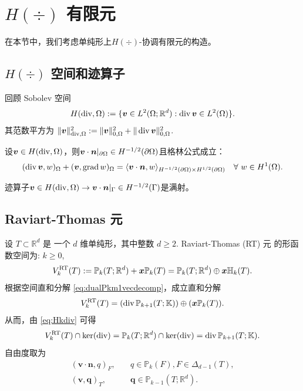 \section{$H(\div)$ 有限元}
在本节中，我们考虑单纯形上$H(\div)$-协调有限元的构造。

\subsection{$H(\div)$ 空间和迹算子}
回顾 Sobolev 空间
\[
H(\div,\Omega):=\{\bs v\in L^2(\Omega;\mathbb R^d): \div\bs v\in L^2(\Omega)\}.
\]
其范数平方为 $\|\bs v\|_{\div, \Omega}^2:=\|\bs v\|_{0, \Omega}^2+\|\div\bs v\|_{0, \Omega}^2$.
\begin{lemma}
设$\bs v\in H(\div,\Omega)$，则$\bs v\cdot\bs n|_{\partial\Omega}\in H^{-1/2}(\partial\Omega)$且格林公式成立：
\[
(\div\bs v, w)_{\Omega} + (\bs v, \grad w)_{\Omega}=\langle\bs v\cdot\bs n, w\rangle_{H^{-1/2}(\partial\Omega)\times H^{1/2}(\partial\Omega)}\quad\forall~w\in H^1(\Omega).
\]
\end{lemma}

\begin{lemma}
迹算子$\bs v\in H(\div,\Omega)\to\bs v\cdot\bs n|_{\Gamma}\in H^{-1/2}(\Gamma)$是满射。
\end{lemma}



\subsection{Raviart-Thomas 元}

设 $T\subset \mathbb R^d$ 是 一个 $d$ 维单纯形，其中整数 $d\geq2$. Raviart-Thomas (RT) 元 \cite{RaviartThomas1977,Nedelec1980,ChenHuang2022} 的形函数空间为: $k\geq0$,
$$
V_k^{\rm RT}(T):= \mathbb P_{k}(T; \mathbb R^d) + \boldsymbol x\mathbb P_{k}(T)=\mathbb P_{k}(T; \mathbb R^d) \oplus \boldsymbol x\mathbb H_{k}(T).
$$ 
根据空间直和分解 \eqref{eq:dualPkm1vecdecomp}，成立直和分解
$$
V_k^{\rm RT}(T)= (\div\mathbb P_{k+1}(T;\mathbb K))\oplus (\boldsymbol x\mathbb P_{k}(T)).
$$ 
从而，由 \eqref{eq:Hkdiv} 可得 
$$
V_k^{\rm RT}(T)\cap\ker(\div)=\mathbb P_{k}(T; \mathbb R^d)\cap\ker(\div)=\div\mathbb P_{k+1}(T;\mathbb K).
$$
自由度取为
\begin{subequations}\label{RTfemdof}
\begin{align}
(\boldsymbol v\cdot\boldsymbol  n, q)_F, & \quad q\in\mathbb P_{k}(F),  F\in\Delta_{d-1}(T),\label{RTfemdof1}\\
(\boldsymbol v, \boldsymbol q)_T, & \quad \boldsymbol q\in\mathbb P_{k-1}(T; \mathbb R^d). \label{RTfemdof2}
\end{align}
\end{subequations}

